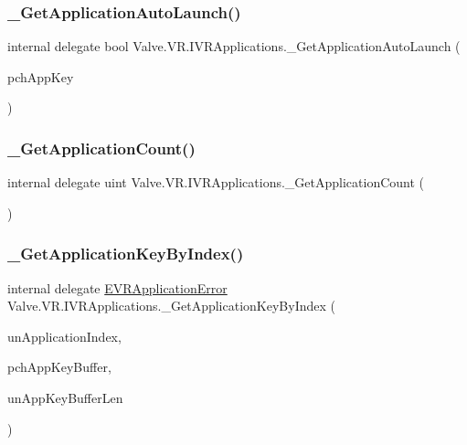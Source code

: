 \subsubsection{\texorpdfstring{\_GetApplicationAutoLaunch()}{\_GetApplicationAutoLaunch()}}
{\footnotesize\ttfamily internal delegate bool Valve.\+V\+R.\+I\+V\+R\+Applications.\+\_\+\+Get\+Application\+Auto\+Launch (\begin{DoxyParamCaption}\item[{string}]{pch\+App\+Key }\end{DoxyParamCaption})}

\mbox{\label{struct_valve_1_1_v_r_1_1_i_v_r_applications_ad5a465e75026a5c1bf8e787a8613132b}} 
\subsubsection{\texorpdfstring{\_GetApplicationCount()}{\_GetApplicationCount()}}
{\footnotesize\ttfamily internal delegate uint Valve.\+V\+R.\+I\+V\+R\+Applications.\+\_\+\+Get\+Application\+Count (\begin{DoxyParamCaption}{ }\end{DoxyParamCaption})}

\mbox{\label{struct_valve_1_1_v_r_1_1_i_v_r_applications_a63e1092a4592ad95064f4948b5bc743f}} 
\subsubsection{\texorpdfstring{\_GetApplicationKeyByIndex()}{\_GetApplicationKeyByIndex()}}
{\footnotesize\ttfamily internal delegate \mbox{\hyperlink{namespace_valve_1_1_v_r_a3488adab8a219b579fcee50f4e63a8b6}{E\+V\+R\+Application\+Error}} Valve.\+V\+R.\+I\+V\+R\+Applications.\+\_\+\+Get\+Application\+Key\+By\+Index (\begin{DoxyParamCaption}\item[{uint}]{un\+Application\+Index,  }\item[{System.\+Text.\+String\+Builder}]{pch\+App\+Key\+Buffer,  }\item[{uint}]{un\+App\+Key\+Buffer\+Len }\end{DoxyParamCaption})}

